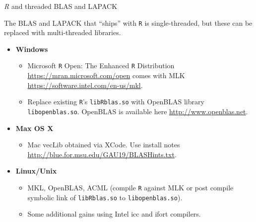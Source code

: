 \begin{frame}
\begin{center}
\emph{R} and threaded BLAS and LAPACK
\end{center}

The BLAS and LAPACK that ``ships'' with \texttt{R} is single-threaded, but these can be replaced with multi-threaded libraries.

\begin{itemize}\setlength{\itemsep}{0.4cm}
\item[]\textbf{Windows}
  \begin{itemize}\setlength{\itemsep}{0.4cm}
  \item Microsoft \texttt{R} Open: The Enhanced \texttt{R} Distribution \url{https://mran.microsoft.com/open} comes with MLK \url{https://software.intel.com/en-us/mkl}.
  \item Replace existing \texttt{R}'s \texttt{libRblas.so} with OpenBLAS library \texttt{libopenblas.so}. OpenBLAS is available here \url{http://www.openblas.net}.
  \end{itemize}
\item[]\textbf{Max OS X}
  \begin{itemize}
  \item Mac vecLib obtained via XCode. Use install notes \url{http://blue.for.msu.edu/GAU19/BLASHints.txt}. 
  \end{itemize}
\item[]\textbf{Linux/Unix}
  \begin{itemize}\setlength{\itemsep}{0.4cm}
  \item MKL, OpenBLAS, ACML (compile \texttt{R} against MLK or post compile symbolic link of \texttt{libRblas.so} to \texttt{libopenblas.so}).
  \item Some additional gains using Intel icc and ifort compilers.
  \end{itemize}
\end{itemize}
\end{frame}


